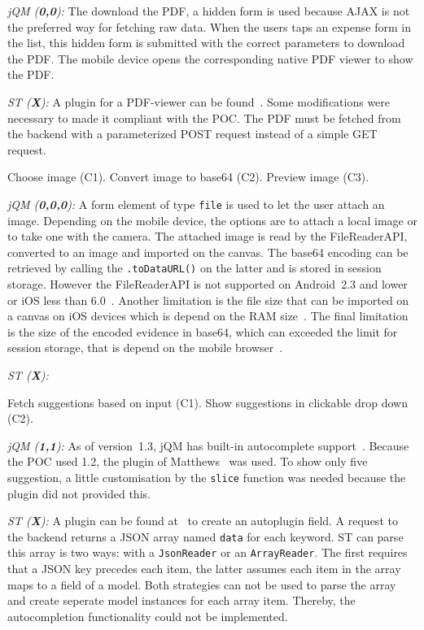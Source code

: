 \documentclass[a4paper]{artikel3}
\newcommand{\code}[1]{\texttt{#1}}
\renewcommand{\paragraph}[1]{\vspace{2mm} \noindent {\bf #1}  }
\newcommand{\framework}[2]{ \emph{#1 (\textbf{#2}): }} %
\newcommand{\challenge}[1]{\paragraph{#1}}
\begin{document}
\framework{jQM}{0,0}
The download the PDF, a hidden form is used because AJAX is not the preferred way for fetching raw data.
When the users taps an expense form in the list, this hidden form is submitted with the correct parameters to download the PDF.
The mobile device opens the corresponding native PDF viewer to show the PDF.

\framework{ST}{X}
A plugin for a PDF-viewer can be found~\cite{Fiedler2012}.  Some modifications were necessary to made it compliant with the POC.  The PDF must be fetched from the backend with a parameterized POST request instead of a simple GET request.  

\challenge{Attach image (C1,C2,C3)}
Choose image (C1).
Convert image to base64 (C2).
Preview image (C3).

\framework{jQM}{0,0,0}
A form element of type \code{file} is used to let the user attach an image.
Depending on the mobile device, the options are to attach a local image or to take one with the camera.
The attached image is read by the FileReaderAPI, converted to an image and imported on the canvas.
The base64 encoding can be retrieved by calling the \code{.toDataURL()} on the latter and is stored in session storage.
However the FileReaderAPI is not supported on Android~2.3 and lower or iOS less than 6.0~\cite{Deveria2013a}.
Another limitation is the file size that can be imported on a canvas on iOS devices which is depend on the RAM size~\cite{Apple2012}.
The final limitation is the size of the encoded evidence in base64, which can exceeded the limit for session storage, that is depend on the mobile browser~\cite{Gonzalez2012}.

\framework{ST}{X}

\challenge{Autocomplete (C1,C2)}
Fetch suggestions based on input (C1).
Show suggestions in clickable drop down (C2).

\framework{jQM}{1,1}
As of version~1.3, jQM has built-in autocomplete support~\cite{JQuery2013c}.
Because the POC used 1.2, the plugin of Matthews~\cite{Matthews2013} was used.
To show only five suggestion, a little customisation by the \code{slice} function was needed because the plugin did not provided this.

\framework{ST}{X}
A plugin can be found at~\cite{Mysamplecode2012} to create an autoplugin field.  A request to the backend returns a JSON array named \code{data} for each keyword.  ST can parse this array is two ways:  with a \code{JsonReader} or an \code{ArrayReader}.  The first requires that a JSON key precedes each item,  the latter assumes each item in the array maps to a field of a model.  Both strategies can not be used to parse the array and create seperate model instances for each array item.  Thereby,  the autocompletion functionality could not be implemented.
\end{document}
